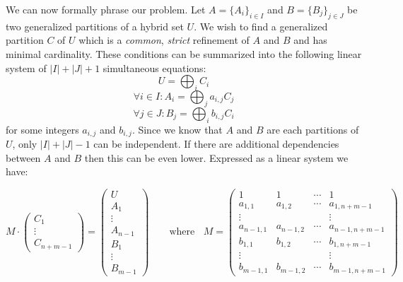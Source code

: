 We can now formally phrase our problem.
Let $A=\{ A_i \}_{i \in I}$ and $B=\{ B_j \}_{j \in J}$ be two generalized partitions of a hybrid set $U$.
We wish to find a generalized partition $C$  of $U$ which is a \emph{common}, \emph{strict} refinement of $A$ and $B$
and has minimal cardinality.
These conditions can be summarized into the following linear system of $|I| + |J| +1$ simultaneous equations:
\begin{equation*}
	U = \bigoplus_i C_i
\end{equation*}
\begin{equation*}
	\forall i \in I : A_i = \bigoplus_j  a_{i,j} C_j
\end{equation*}
\begin{equation*}
	\forall j \in J : B_j = \bigoplus_i b_{i,j} C_i
\end{equation*}
for some integers $a_{i,j}$ and $b_{i,j}$.
Since we know that $A$ and $B$ are each partitions of $U$, only $|I|+|J|-1$ can be independent.
If there are additional dependencies between $A$ and $B$ then this can be even lower.
Expressed as a linear system we have:


\begin{equation*}
	M \cdot 
		\begin{pmatrix}
			C_1 	\\
			\vdots 	\\
			C_{n+m-1}
		\end{pmatrix}
	=
		\begin{pmatrix}
			U 		\\[-0.5em] 
			A_1 	\\[-0.5em] 
			\vdots 	\\[-0.5em] 
			A_{n-1}	\\[-0.5em] 
			B_1 	\\[-0.5em] 
			\vdots 	\\[-0.5em] 
			B_{m-1}
		\end{pmatrix}
	\;\;\;\;\;\;\text{ where }\;\;
	M = \begin{pmatrix}
			1			& 1			& \cdots 	& 1 					\\[-0.5em]
			a_{1,1}		& a_{1,2}	& \cdots 	& a_{1, n+m-1} 		\\[-0.5em]
			\vdots 		&			&			& \vdots 			\\[-0.5em]
			a_{n-1,1}	& a_{n-1, 2}	& \cdots 	& a_{n-1, n+m-1} 	\\[-0.5em]
			b_{1,1} 		& b_{1,2} 	& \cdots 	& b_{1, n+m-1}		\\[-0.5em]
			\vdots 		& 			&			& \vdots 			\\[-0.5em]
			b_{m-1,1} 	& b_{m-1,2}	& \cdots 	& b_{m-1,n+m-1}
	\end{pmatrix}
\end{equation*}


